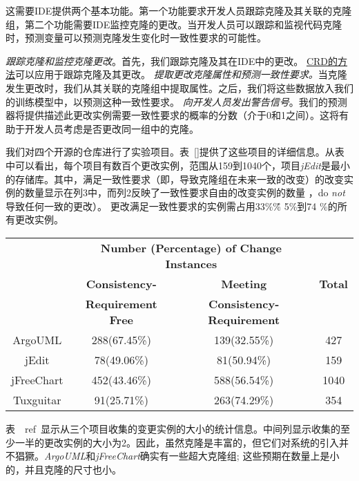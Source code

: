 这需要IDE提供两个基本功能。第一个功能要求开发人员跟踪克隆及其关联的克隆组，第二个功能需要IDE监控克隆的更改。当开发人员可以跟踪和监视代码克隆时，预测变量可以预测克隆发生变化时一致性要求的可能性。 {\emph {跟踪克隆和监控克隆更改}。首先，我们跟踪克隆及其在IDE中的更改。 \underline {CRD的方法}可以应用于跟踪克隆及其更改。 \emph {提取更改克隆属性和预测一致性要求。}当克隆发生更改时，我们从其关联的克隆组中提取属性。之后，我们将这些数据放入我们的训练模型中，以预测这种一致性要求。 \emph {向开发人员发出警告信号}。我们的预测器将提供描述此更改实例需要一致性要求的概率的分数（介于0和1之间）。这将有助于开发人员考虑是否更改同一组中的克隆。



我们对四个开源的仓库进行了实验项目。表~\ref {}提供了这些项目的详细信息。从表中可以看出，每个项目有数百个更改实例，范围从159到1040个，项目{\em  jEdit}是最小的存储库。其中，满足一致性要求（即，导致克隆组在未来一致的改变）的改变实例的数量显示在列3中，而列2反映了一致性要求自由的改变实例的数量 ，do {\em not }导致任何一致的更改）。
更改满足一致性要求的实例需占用33\%\~\% 5\%到74 \%的所有更改实例。

\begin{table}[htbp]
\vspace{0.5em}\centering\wuhao
\begin{tabular}{cccc}
\toprule[1.5pt]
~\multirow{3}{*}{\textbf{Project}}& \multicolumn{2}{c}{\textbf{Number (Percentage) of Change Instances}} & \multirow{3}{*}{\textbf{Total}}\\ 
 \cline{2-3}
 ~& \textbf{Consistency-} &\textbf{Meeting} & ~\\

 &\textbf{Requirement Free}&\textbf{Consistency-Requirement}&\\
\midrule[1pt]
ArgoUML&288(67.45\%)&139(32.55\%)&427\\
\hline
jEdit&78(49.06\%)&81(50.94\%)&159\\
\hline
jFreeChart&452(43.46\%)&588(56.54\%)&1040\\
\hline
Tuxguitar&91(25.71\%)&263(74.29\%)&354\\
\bottomrule[1.5pt]
\end{tabular}
\end{table}

表~\ ref{}~显示从三个项目收集的变更实例的大小的统计信息。中间列显示收集的至少一半的更改实例的大小为2。因此，虽然克隆是丰富的，但它们对系统的引入并不猖獗。{\em  ArgoUML}和{\em jFreeChart}确实有一些超大克隆组; 这些预期在数量上是小的，并且克隆的尺寸也小。

}
